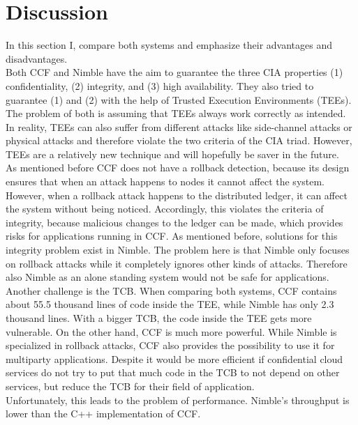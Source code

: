 \section{Discussion}
\label{challenges:ccf}
In this section I, compare both systems and emphasize their advantages and disadvantages.\\
Both CCF and Nimble have the aim to guarantee the three CIA properties (1) confidentiality, (2) integrity, and (3) high availability. They also tried to guarantee (1) and (2) with the help of Trusted Execution Environments (TEEs). The problem of both is assuming that TEEs always work correctly as intended. In reality, TEEs can also suffer from different attacks like side-channel attacks or physical attacks and therefore violate the two criteria of the CIA triad. However, TEEs are a relatively new technique and will hopefully be saver in the future.\\
As mentioned before CCF does not have a rollback detection, because its design ensures that when an attack happens to nodes it cannot affect the system. However, when a rollback attack happens to the distributed ledger, it can affect the system without being noticed. Accordingly, this violates the criteria of integrity, because malicious changes to the ledger can be made, which provides risks for applications running in CCF.
As mentioned before, solutions for this integrity problem exist in Nimble. The problem here is that Nimble only focuses on rollback attacks while it completely ignores other kinds of attacks. Therefore also Nimble as an alone standing system would not be safe for applications.\\
Another challenge is the TCB. When comparing both systems, CCF contains about 55.5 thousand lines of code inside the TEE, while Nimble has only 2.3 thousand lines. With a bigger TCB, the code inside the TEE gets more vulnerable. On the other hand, CCF is much more powerful. While Nimble is specialized in rollback attacks, CCF also provides the possibility to use it for multiparty applications.  Despite it would be more efficient if confidential cloud services do not try to put that much code in the TCB to not depend on other services, but reduce the TCB for their field of application.\\
 Unfortunately, this leads to the problem of performance. Nimble's throughput is lower than the C++ implementation of CCF. \\
  


